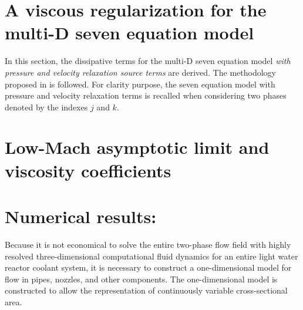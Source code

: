 \section{A viscous regularization for the multi-D seven equation model}\label{sec:sev-equ-visc-reg-sect4}
In this section, the dissipative terms for the multi-D seven equation model \emph{with pressure and velocity relaxation source terms} are derived. The methodology proposed in   is followed. For clarity purpose, the seven equation model with pressure and velocity relaxation terms is recalled when considering two phases denoted by the indexes $j$ and $k$.  
\section{Low-Mach asymptotic limit and viscosity coefficients}\label{sec:sev-equ-visc-coeff-sect4}
\section{Numerical results:}\label{sec:1d-num-res-sect4}
Because it is not economical to solve the entire two-phase flow field
with highly resolved three-dimensional computational fluid dynamics for an
entire light water reactor coolant system,
it is necessary to construct a one-dimensional model for flow in
pipes, nozzles, and other components.  The one-dimensional model is
constructed to allow the representation of continuously variable
cross-sectional area.

